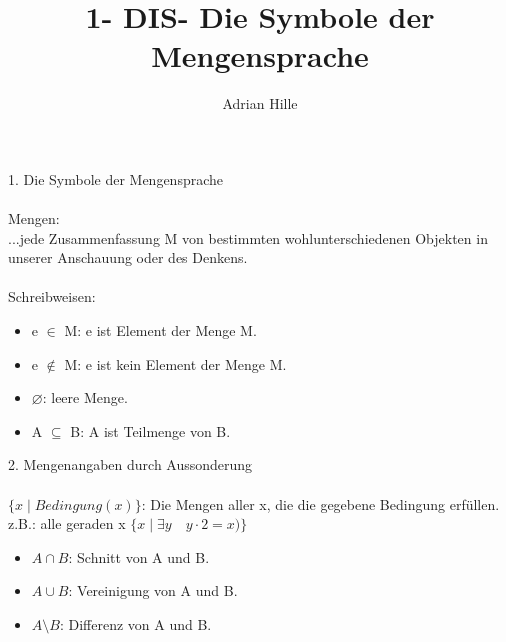\documentclass{scrartcl}\usepackage[utf8]{inputenc}
\title{1- DIS- Die Symbole der Mengensprache}
\author{Adrian Hille}
\begin{document}
\Large 1. Die Symbole der Mengensprache
\\
\\
\normalsize
Mengen: \\ 
...jede Zusammenfassung M von bestimmten wohlunterschiedenen Objekten in unserer Anschauung oder des Denkens.\\
\\
Schreibweisen: 
   \begin{itemize}
    	\item e $\in$ M: e ist Element der Menge M.
    	\item e $\notin$ M: e ist kein Element der Menge M.
  	\item $\varnothing$: leere Menge.
    	\item A $\subseteq$ B: A ist Teilmenge von B.
    \end{itemize}

\Large 2. Mengenangaben durch Aussonderung
\\
\\
\normalsize
$\{x \mid Bedingung (x) \}$:  Die Mengen aller x, die die gegebene Bedingung erf\"ullen.\\
z.B.: alle geraden x
$\{x \mid \exists y \quad y\cdot 2=x) \}$
\\
  \begin{itemize}
    	\item $A \cap B$: Schnitt von A und B.
    	\item $A \cup B$: Vereinigung von A und B.
  	\item $A \setminus B$: Differenz von A und B.
    \end{itemize}
\end{document}
